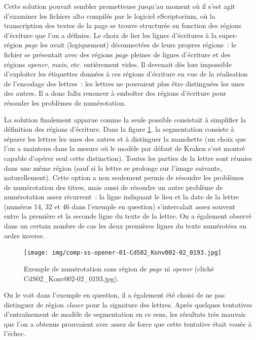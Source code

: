 \documentclass[a4paper,12pt,twoside]{book}
\begin{document}
				Cette solution pouvait sembler prometteuse jusqu'au moment où il s'est agit d'examiner les fichiers \gls{alto} compilés par le logiciel eScriptorium, où la transcription des textes de la page se trouve structurée en fonction des régions d'écriture que l'on a définies. Le choix de lier les lignes d'écritures à la super-région \textit{page} les avait (logiquement) déconnectées de leurs propres régions~: le fichier se présentait avec des régions \textit{page} pleines de lignes d'écriture et des régions \textit{opener}, \textit{main}, etc. entièrement vides. Il devenait dès lors impossible d'exploiter les étiquettes données à ces régions d'écriture en vue de la réalisation de l'encodage des lettres~: les lettres ne pouvaient plus être distinguées les unes des autres. Il a donc fallu renoncer à emboîter des régions d'écriture pour résoudre les problèmes de numérotation. 
				
				La solution finalement apparue comme la seule possible consistait à simplifier la définition des régions d'écriture. Dans la figure \ref{comp-ss-opener-193}, la {segmentation} consiste à séparer les lettres les unes des autres et à distinguer la manchette (un choix que l'on a maintenu dans la mesure où le modèle par défaut de Kraken s'est montré capable d'opérer seul cette distinction). Toutes les parties de la lettre sont réunies dans une même région (sauf si la lettre se prolonge sur l'image suivante, naturellement). Cette option a non seulement permis de résoudre les problèmes de numérotation des titres, mais aussi de résoudre un autre problème de numérotation assez récurrent~: la ligne indiquant le lieu et la date de la lettre (numéros 14, 32 et 46 dans l'exemple en question) s'intercalait assez souvent entre la première et la seconde ligne du texte de la lettre. On a également observé dans un certain nombre de cas les deux premières lignes du texte numérotées en ordre inverse.
				
				\begin{figure}[!h]
					\centering
					\texttt{[image: img/comp-ss-opener-01-CdS02\_Konv002-02\_0193.jpg]}
					\caption{Exemple de numérotation sans région de \textit{page} ni \textit{opener} (cliché CdS02\_Konv002-02\_0193.jpg).}
					\label{comp-ss-opener-193}
				\end{figure}
				
				On le voit dans l'exemple en question, il a également été choisi de ne pas distinguer de région \textit{closer} pour la signature des lettres. Après quelques tentatives d'entraînement de modèle de {segmentation} en ce sens, les résultats très mauvais que l'on a obtenus prouvaient avec assez de force que cette tentative était vouée à l'échec.
				
\end{document}
